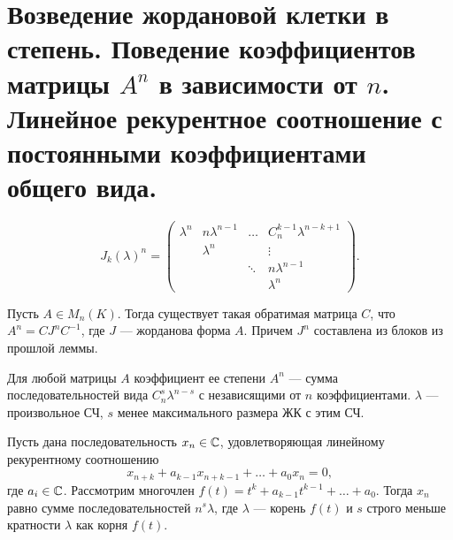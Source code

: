 \section{Возведение жордановой клетки в степень. Поведение коэффициентов матрицы $ A^{n} $ в зависимости от $ n$. Линейное рекурентное соотношение с постоянными коэффициентами общего вида.}
\begin{lm}
    \[
	J_k(\lambda)^{n} = 
	\begin{pmatrix}
	    \lambda ^{n} & n\lambda^{n-1} & \ldots & C_{n}^{k-1} \lambda ^{n-k+1} \\
			 & \lambda ^{n} & & \vdots \\
			 & & \ddots  & n \lambda^{n - 1} \\
			 & & & \lambda ^{n}
	\end{pmatrix}
    .\] 
\end{lm}
\begin{cor}
    Пусть $ A \in  M_n(K)$. Тогда существует такая обратимая матрица $ C$, что  $ A^{n} = C J^{n} C^{-1}$, где $ J$ --- жорданова форма  $ A$. Причем  $ J^{n}$ составлена из блоков из прошлой леммы.
\end{cor}
\begin{cor}
    Для любой матрицы $ A$ коэффициент ее степени $ A^{n}$ --- сумма последовательностей вида $ C_{n}^{s} \lambda ^{n-s}$ с независящими от   $ n$ коэффициентами. $ \lambda $ --- произвольное СЧ, $ s$ менее максимального размера ЖК с этим СЧ.
\end{cor}
\begin{cor}
    Пусть дана последовательность $ x_n \in \mathbb{C}$, удовлетворяющая линейному рекурентному соотношению
    \[
    x_{n+k} + a_{k-1} x_{n+k-1} + \ldots + a_0 x_n = 0
    ,\] 
    где $ a_i \in \mathbb{C}$. Рассмотрим многочлен $ f(t) = t ^{k} + a_{k-1} t ^{k-1} + \ldots + a_0$. Тогда $ x_n $ равно сумме последовательностей  $ n^{s} \lambda $, где $ \lambda $ --- корень $ f(t)$ и  $ s$ строго меньше кратности $ \lambda $ как корня $ f(t)$. 
\end{cor}


